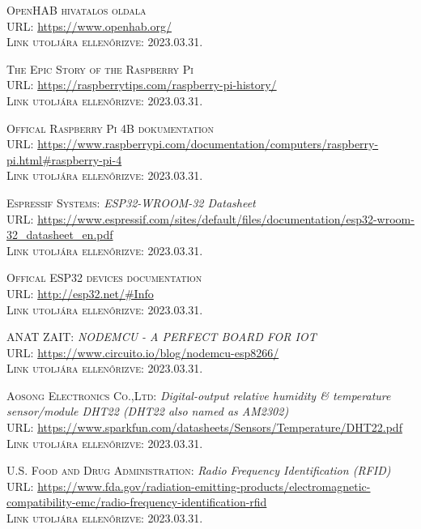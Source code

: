 \documentclass[
]{thesis-ekf}
\theoremstyle{definition}
\theoremstyle{remark}
\begin{document}
\begin{thebibliography}{20}
		\textsc{OpenHAB hivatalos oldala}\\
		\textsc{URL:} \url{https://www.openhab.org/}\\
		\textsc{Link utoljára ellenőrizve:} 2023.03.31.
		
		\textsc{The Epic Story of the Raspberry Pi}\\
		\textsc{URL:} \url{https://raspberrytips.com/raspberry-pi-history/}\\
		\textsc{Link utoljára ellenőrizve:} 2023.03.31.
		
		\textsc{Offical Raspberry Pi 4B dokumentation}\\
		\textsc{URL:} \url{https://www.raspberrypi.com/documentation/computers/raspberry-pi.html#raspberry-pi-4}\\
		\textsc{Link utoljára ellenőrizve:} 2023.03.31.
		
		\textsc{Espressif Systems:} \emph{ESP32­-WROOM-­32 Datasheet}\\
		\textsc{URL:} \url{https://www.espressif.com/sites/default/files/documentation/esp32-wroom-32_datasheet_en.pdf}\\
		\textsc{Link utoljára ellenőrizve:} 2023.03.31.
		
		\textsc{Offical ESP32 devices documentation}\\
		\textsc{URL:} \url{http://esp32.net/#Info}\\
		\textsc{Link utoljára ellenőrizve:} 2023.03.31.
		
		\textsc{ANAT ZAIT:} \emph{NODEMCU - A PERFECT BOARD FOR IOT}\\
		\textsc{URL:} \url{https://www.circuito.io/blog/nodemcu-esp8266/}\\
		\textsc{Link utoljára ellenőrizve:} 2023.03.31.
		
		\textsc{Aosong Electronics Co.,Ltd:} \emph{Digital-output relative humidity \& temperature sensor/module DHT22 (DHT22 also named as AM2302)}\\
		\textsc{URL:} \url{https://www.sparkfun.com/datasheets/Sensors/Temperature/DHT22.pdf}\\
		\textsc{Link utoljára ellenőrizve:} 2023.03.31.
		
		\textsc{U.S. Food and Drug Administration:} \emph{Radio Frequency Identification (RFID)}\\
		\textsc{URL:} \url{https://www.fda.gov/radiation-emitting-products/electromagnetic-compatibility-emc/radio-frequency-identification-rfid}\\
		\textsc{Link utoljára ellenőrizve:} 2023.03.31.
		

\end{thebibliography}
\end{document}
